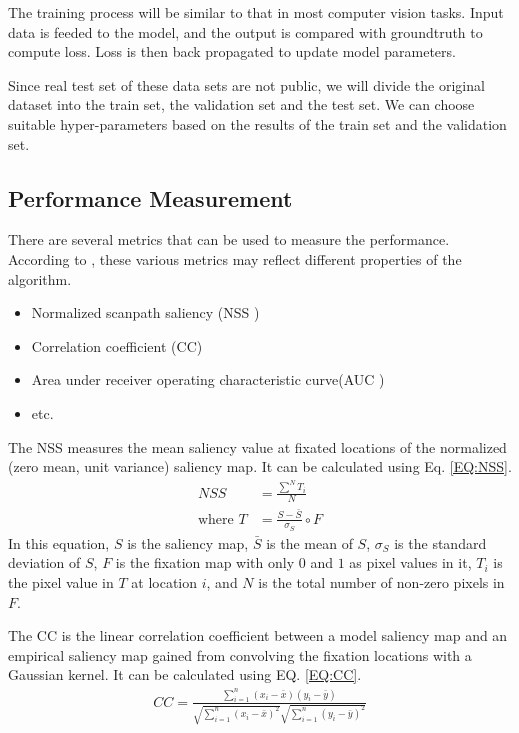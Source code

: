 \documentclass[12pt]{article}
\begin{document}
The training process will be similar to that in most computer vision tasks. Input data is feeded to the model,
and the output is compared with groundtruth to compute loss. Loss is then back propagated to update model parameters.

Since real test set of these data sets are not public, we will divide the original dataset into the train set, the validation set and the test set. We can choose suitable hyper-parameters based on the results of the train set and the validation set.

\subsection{Performance Measurement}

There are several metrics that can be used to measure the performance. According to \cite{riche2013saliency}, these various metrics may reflect different properties of the algorithm.
\begin{itemize}
    \item Normalized scanpath saliency (NSS \cite{petersComponentsBottomupGaze2005})
    \item Correlation coefficient (CC)
    \item Area under receiver operating characteristic curve(AUC \cite{richeSaliencyHumanFixations2013})
    \item etc.
\end{itemize}

The NSS measures the mean saliency value at fixated locations of the normalized (zero mean, unit variance) saliency map. 
It can be calculated using Eq. \ref{EQ:NSS}. 
\begin{equation}
    \begin{aligned}
        NSS &= \frac{\sum^{N} T_{i}}{N}\\
        \text{where }T &= \frac{S - \bar{S}}{\sigma_{S}} \circ F
    \end{aligned}
    \label{EQ:NSS}
\end{equation}
In this equation, $S$ is the saliency map, $\bar{S}$ is the mean of $S$, $\sigma_{S}$ is 
the standard deviation of $S$, $F$ is the fixation map with only $0$ and $1$ as pixel values in it,
$T_{i}$ is the pixel value in $T$ at location $i$, and $N$ is the total number of non-zero pixels in $F$.

The CC is the linear correlation coefficient between a model saliency map and an empirical saliency map 
gained from convolving the fixation locations with a Gaussian kernel. It can be calculated using EQ. \ref{EQ:CC}. 
\begin{equation}
    \begin{aligned}
        CC = \frac{\sum_{i=1}^{n}(x_{i}-\bar{x})(y_{i}-\bar{y})}
        {\sqrt{\sum_{i=1}^{n}(x_{i}-\bar{x})^{2}}\sqrt{\sum_{i=1}^{n}(y_{i}-\bar{y})^{2}}}
    \end{aligned}
    \label{EQ:CC}
\end{equation}
\end{document}
